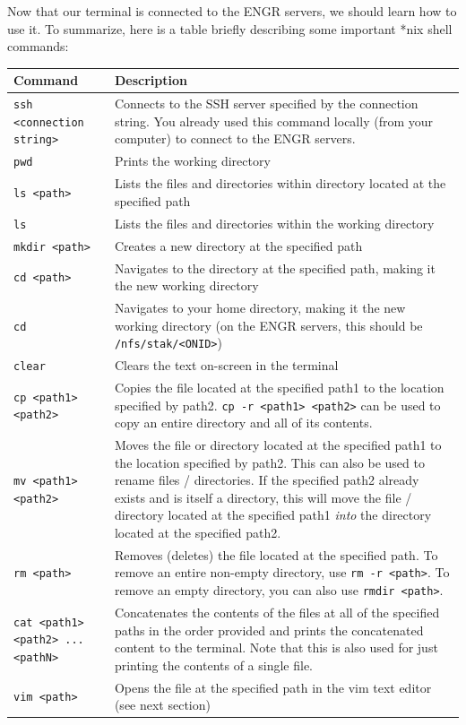 \documentclass{article}
\begin{document}
Now that our terminal is connected to the ENGR servers, we should learn how to use it. To summarize, here is a table briefly describing some important *nix shell commands:

\begin{tabular}{|p{}|p{}|}
    \hline
    Command & Description\\
    \hline
    \texttt{ssh <connection string>} & Connects to the SSH server specified by the connection string. You already used this command locally (from your computer) to connect to the ENGR servers.\\
    \hline
    \texttt{pwd} & Prints the working directory\\
    \hline
    \texttt{ls <path>} & Lists the files and directories within directory located at the specified path\\
    \hline
    \texttt{ls} & Lists the files and directories within the working directory\\
    \hline
    \texttt{mkdir <path>} & Creates a new directory at the specified path\\
    \hline
    \texttt{cd <path>} & Navigates to the directory at the specified path, making it the new working directory\\
    \hline
    \texttt{cd} & Navigates to your home directory, making it the new working directory (on the ENGR servers, this should be \texttt{/nfs/stak/<ONID>})\\
    \hline
    \texttt{clear} & Clears the text on-screen in the terminal\\
    \hline
    \texttt{cp <path1> <path2>} & Copies the file located at the specified path1 to the location specified by path2. \texttt{cp -r <path1> <path2>} can be used to copy an entire directory and all of its contents.\\
    \hline
    \texttt{mv <path1> <path2>} & Moves the file or directory located at the specified path1 to the location specified by path2. This can also be used to rename files / directories. If the specified path2 already exists and is itself a directory, this will move the file / directory located at the specified path1 \textit{into} the directory located at the specified path2.\\
    \hline
    \texttt{rm <path>} & Removes (deletes) the file located at the specified path. To remove an entire non-empty directory, use \texttt{rm -r <path>}. To remove an empty directory, you can also use \texttt{rmdir <path>}.\\
    \hline
    \texttt{cat <path1> <path2> ... <pathN>} & Concatenates the contents of the files at all of the specified paths in the order provided and prints the concatenated content to the terminal. Note that this is also used for just printing the contents of a single file.\\
    \hline
    \texttt{vim <path>} & Opens the file at the specified path in the vim text editor (see next section)\\
    \hline
\end{tabular}
\end{document}
